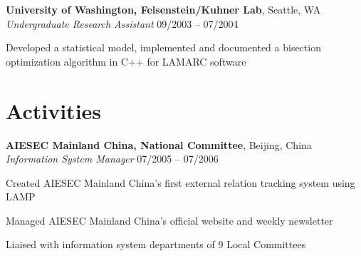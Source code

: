 \documentclass[margin,line]{resume}
\begin{document}
\begin{resume}
    \textbf{University of Washington, Felsenstein/Kuhner Lab}, Seattle, WA \\
    \textsl{Undergraduate Research Assistant} \hfill 09/2003 -- 07/2004  \vspace{-3mm}\\\vspace{-1mm}%
      \begin{list2}
      \item Developed a statistical model, implemented and documented a bisection optimization algorithm in C++ for LAMARC software 
      \end{list2}
      
    \section{\mysidestyle Activities}

    \textbf{AIESEC Mainland China, National Committee}, Beijing, China \\
    \textsl{Information System Manager} \hfill 07/2005 -- 07/2006 \vspace{-3mm}\\\vspace{-1mm}%
      \begin{list2}
      \item Created AIESEC Mainland China's first external relation tracking system using LAMP
      \item Managed AIESEC Mainland China's official website and weekly newsletter 
      \item Liaised with information system departments of 9 Local Committees 
      \end{list2}
 

\end{resume}
\end{document}
